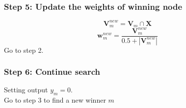 \subsubsection{Step 5: Update the weights of winning node}
$$\mathbf{V}_m^{new} = \mathbf{V}_m \cap \mathbf{X}$$
$$\mathbf{w}_m^{new} = \frac{\mathbf{V}_m^{new}}{0.5 + | \mathbf{V}_m^{new} |}$$
Go to step 2.
\subsubsection{Step 6: Continue search}
Setting output $y_m = 0$. \\
Go to step 3 to find a new winner $m$
